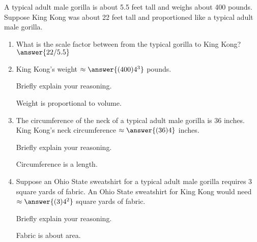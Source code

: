 \documentclass[nooutcomes]{ximera}
\begin{document}
\begin{problem}
A typical adult male gorilla is about 5.5 feet tall and weighs about 400 pounds. Suppose King Kong was about 22 feet tall and proportioned like a typical adult male gorilla.
\begin{enumerate}
\item What is the scale factor between from the typical gorilla to King Kong?  $\answer{22/5.5}$
\item King Kong's weight $\approx \answer{(400)4^3}$  pounds.

Briefly explain your reasoning.  \begin{hint}Weight is proportional to volume.\end{hint}
\item The circumference of the neck of a typical adult male gorilla is 36 inches. King Kong's neck circumference $\approx \answer{(36)4}$ inches. 

Briefly explain your reasoning.  \begin{hint}Circumference is a length.\end{hint}
\item Suppose an Ohio State sweatshirt for a typical adult male gorilla requires 3 square yards of fabric.  An Ohio State sweatshirt for 
King Kong would need $\approx \answer{(3)4^2}$ square yards of fabric. 

Briefly explain your reasoning.  \begin{hint}Fabric is about area.\end{hint}
\end{enumerate}
\end{problem}
\end{document}
